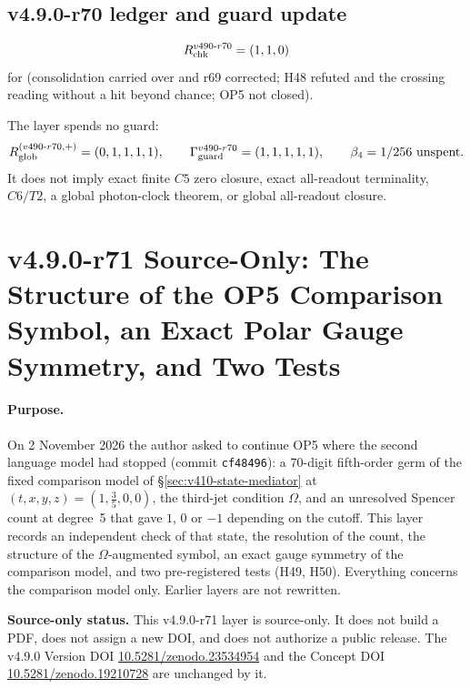 \subsection*{v4.9.0-r70 ledger and guard update}
\label{subsec:v490-r70-ledger-guard}

\[
R_{\rm chk}^{v490\text{-}r70}=(1,1,0)
\]
for (consolidation carried over and r69 corrected; H48 refuted and the crossing reading without a hit beyond chance; OP5 not closed).

The layer spends no guard:
\[
R_{\rm glob}^{(v490\text{-}r70,+)}=(0,1,1,1,1),
\qquad
\Gamma_{\rm guard}^{v490\text{-}r70}=(1,1,1,1,1),
\qquad
\beta_4=1/256\ \text{unspent}.
\]
It does not imply exact finite \(C5\) zero closure, exact all-readout terminality,
\(C6/T2\), a global photon-clock theorem, or global all-readout closure.

\clearpage
\section*{v4.9.0-r71 Source-Only: The Structure of the OP5 Comparison Symbol, an Exact Polar Gauge Symmetry, and Two Tests}
\label{sec:v490-r71-op5-symbol}

\paragraph{Purpose.}
On 2 November 2026 the author asked to continue OP5 where the second language model had stopped (commit \texttt{cf48496}): a
70-digit fifth-order germ of the fixed comparison model of \S\ref{sec:v410-state-mediator} at \((t,x,y,z)=(1,\tfrac35,0,0)\),
the third-jet condition \(\Omega\), and an unresolved Spencer count at degree~5 that gave \(1\), \(0\) or \(-1\) depending on the
cutoff.  This layer records an independent check of that state, the resolution of the count, the structure of the
\(\Omega\)-augmented symbol, an exact gauge symmetry of the comparison model, and two pre-registered tests (H49, H50).
Everything concerns the comparison model only.  Earlier layers are not rewritten.

\noindent\textbf{Source-only status.}
This v4.9.0-r71 layer is source-only.  It does not build a PDF, does not assign a new DOI,
and does not authorize a public release.  The v4.9.0 Version DOI
\href{https://doi.org/10.5281/zenodo.23534954}{10.5281/zenodo.23534954} and the Concept DOI
\href{https://doi.org/10.5281/zenodo.19210728}{10.5281/zenodo.19210728} are unchanged by it.


